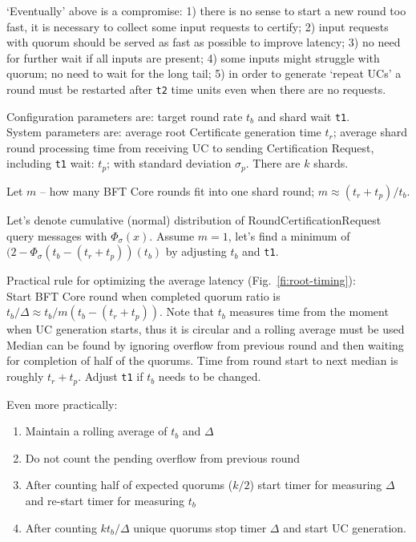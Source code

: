 `Eventually' above is a compromise: 1) there is no sense to start a new round too fast, it is necessary to collect some input requests to certify; 2) input requests with quorum should be served as fast as possible to improve latency; 3) no need for further wait if all inputs are present; 4) some inputs might struggle with quorum; no need to wait for the long tail; 5) in order to generate `repeat UCs' a round must be restarted after \texttt{t2} time units even when there are no requests.

Configuration parameters are: target round rate $t_b$ and shard wait \texttt{t1}.\\
System parameters are: average root Certificate generation time  $t_r$;
average shard round processing time from receiving UC to sending Certification Request, including \texttt{t1} wait: $t_p$; with standard deviation $\sigma_p$. There are $k$ shards.

Let $m$ -- how many BFT Core rounds fit into one shard round; $m \approx (t_r + t_p) / t_b$.

Let's denote cumulative (normal) distribution of RoundCertificationRequest query messages with $\Phi_\sigma(x)$. Assume $m=1$, let's find a minimum of $(2-\Phi_\sigma(t_b - (t_r+t_p))(t_b)$ by adjusting $t_b$ and \texttt{t1}.

Practical rule for optimizing the average latency (Fig.~\ref{fi:root-timing}):\\
Start BFT Core round when completed quorum ratio is $t_b / \Delta \approx t_b / m(t_b - (t_r+t_p))$. Note that $t_b$ measures time from the moment when UC generation starts, thus it is circular and a rolling average must be used Median can be found by ignoring overflow from previous round and then waiting for completion of half of the quorums. Time from round start to next median is roughly $t_r+t_p$. Adjust \texttt{t1} if $t_b$ needs to be changed.

Even more practically:
\begin{enumerate}
  \item Maintain a rolling average of $t_b$ and $\Delta$
  \item Do not count the pending overflow from previous round
  \item After counting half of expected quorums ($k/2$) start timer for measuring $\Delta$ and re-start timer for measuring $t_b$
  \item After counting $k t_b / \Delta$ unique quorums stop timer $\Delta$ and start UC generation.
\end{enumerate}


